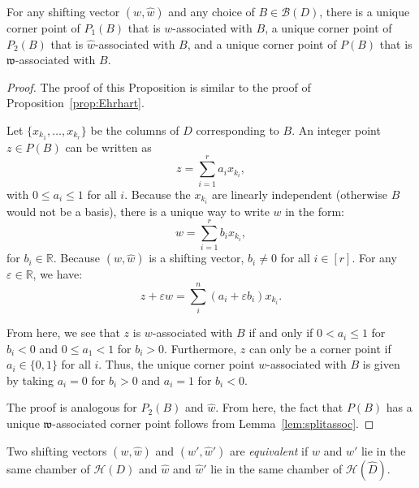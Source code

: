 \documentclass[ALCO,ThmDefs,Unicode,epreuves]{cedram}
\renewcommand{\epsilon}{\varepsilon}
\newcommand{\R}{\mathbb{R}}
\newcommand{\B}{\mathcal{B}}
\newcommand{\colB}[1]{x_{k_{#1}}}
\newcommand{\w}{\mathfrak w}
\begin{document}
\begin{prop}\label{prop:onecorner}
For any shifting vector $(w,\widehat w)$ and any choice of $B \in \B(D)$, there is a unique corner point of $P_1(B)$ that is $w$-associated with $B$, a unique corner point of $P_2(B)$ that is $\widehat w$-associated with $B$, and a unique corner point of $P(B)$ that is $\w$-associated with $B$. 
\end{prop}
\begin{proof}
The proof of this Proposition is similar to the proof of Proposition~\ref{prop:Ehrhart}. 

Let $\{\colB 1,\dots, \colB r\}$ be the columns of $D$ corresponding to $B$. An integer point $z \in P(B)$ can be written as
\[
z = \sum_{i=1}^{r} a_i\colB i,
\]
with $0 \le a_i \le 1$ for all $i$. Because the $\colB i$ are linearly independent (otherwise $B$ would not be a basis), there is a unique way to write $w$ in the form:
\[ 
w = \sum_{i=1}^{r} b_i\colB i,
\]
for $b_i \in \R$. Because $(w,\widehat w)$ is a shifting vector, $b_i \not= 0$ for all $i\in [r]$. For any $\epsilon \in \R$, we have:
\[
z+\epsilon w = \sum_i^{n} (a_i + \epsilon b_i)\colB i.
\]

From here, we see that $z$ is $w$-associated with $B$ if and only if $0 < a_i \le 1$ for $b_i < 0$ and $0 \le a_1 < 1$ for $b_i > 0$. Furthermore, $z$ can only be a corner point if $a_i \in \{0,1\}$ for all $i$. Thus, the unique corner point $w$-associated with $B$ is given by taking $a_i = 0$ for $b_i>0$ and $a_i = 1$ for $b_i < 0$. 

The proof is analogous for $P_2(B)$ and $\widehat w$. From here, the fact that $P(B)$ has a unique $\w$-associated corner point follows from Lemma~\ref{lem:splitassoc}.
\end{proof}

\begin{defi}\label{def:wequiv}
Two shifting vectors $(w,\widehat w)$ and $(w',\widehat w')$ are \emph{equivalent} if $w$ and $w'$ lie in the same chamber of $\mathcal H(D)$ and $\widehat w$ and $\widehat w'$ lie in the same chamber of $\mathcal H(\widehat D)$. 
\end{defi}
\end{document}
